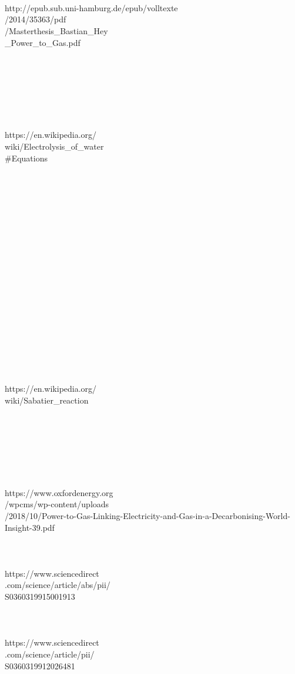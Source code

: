 \begin{parcolumns}[colwidths={1=2.5 cm, 2=10 cm, 3=2.5 cm}]{3}
{\begin{tiny}
\\ \\ \\ 
http://epub.sub.uni-hamburg.de/epub/volltexte\\/2014/35363/pdf\\/Masterthesis\_Bastian\_Hey \\
\_Power\_to\_Gas.pdf
\\ \\ \\ \\ \\ \\ \\ \\ 
https://en.wikipedia.org/\\wiki/Electrolysis\_of\_water \\ 
\#Equations
\\ \\ \\ \\ \\ \\ \\ \\ \\ \\ \\ \\ \\ \\ \\ \\ \\ \\ \\ \\
https://en.wikipedia.org/\\wiki/Sabatier\_reaction
\\ \\ \\ \\ \\ \\ \\ \\
https://www.oxfordenergy.org\\/wpcms/wp-content/uploads\\/2018/10/Power-to-Gas-Linking-Electricity-and-Gas-in-a-Decarbonising-World-Insight-39.pdf
\\ \\ \\ \\
https://www.sciencedirect\\.com/science/article/abs/pii/\\S0360319915001913
\\ \\ \\ \\
https://www.sciencedirect\\.com/science/article/pii/\\S0360319912026481
\end{tiny}
}

\end{parcolumns}

\clearpage
\cfoot{}